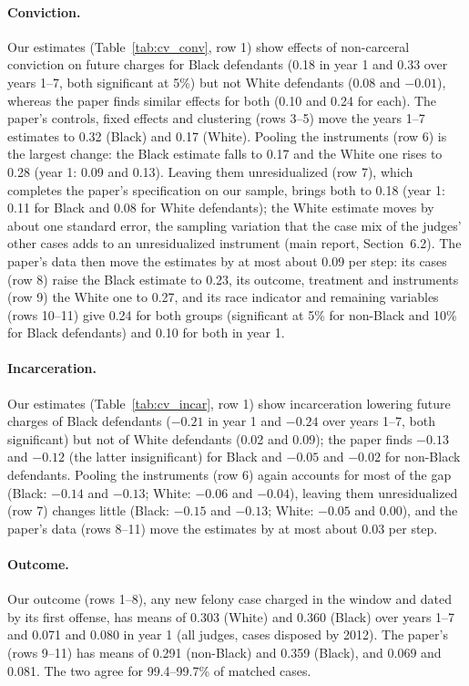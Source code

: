 \documentclass[11pt]{article}
\begin{document}
\paragraph{Conviction.} Our estimates (Table~\ref{tab:cv_conv}, row 1) show effects of non-carceral conviction on future charges for Black defendants (0.18 in year 1 and 0.33 over years 1--7, both significant at 5\%) but not White defendants (0.08 and $-0.01$), whereas the paper finds similar effects for both (0.10 and 0.24 for each). The paper's controls, fixed effects and clustering (rows 3--5) move the years 1--7 estimates to 0.32 (Black) and 0.17 (White). Pooling the instruments (row 6) is the largest change: the Black estimate falls to 0.17 and the White one rises to 0.28 (year 1: 0.09 and 0.13). Leaving them unresidualized (row 7), which completes the paper's specification on our sample, brings both to 0.18 (year 1: 0.11 for Black and 0.08 for White defendants); the White estimate moves by about one standard error, the sampling variation that the case mix of the judges' other cases adds to an unresidualized instrument (main report, Section~6.2). The paper's data then move the estimates by at most about 0.09 per step: its cases (row 8) raise the Black estimate to 0.23, its outcome, treatment and instruments (row 9) the White one to 0.27, and its race indicator and remaining variables (rows 10--11) give 0.24 for both groups (significant at 5\% for non-Black and 10\% for Black defendants) and 0.10 for both in year 1.

\paragraph{Incarceration.} Our estimates (Table~\ref{tab:cv_incar}, row 1) show incarceration lowering future charges of Black defendants ($-0.21$ in year 1 and $-0.24$ over years 1--7, both significant) but not of White defendants (0.02 and 0.09); the paper finds $-0.13$ and $-0.12$ (the latter insignificant) for Black and $-0.05$ and $-0.02$ for non-Black defendants. Pooling the instruments (row 6) again accounts for most of the gap (Black: $-0.14$ and $-0.13$; White: $-0.06$ and $-0.04$), leaving them unresidualized (row 7) changes little (Black: $-0.15$ and $-0.13$; White: $-0.05$ and 0.00), and the paper's data (rows 8--11) move the estimates by at most about 0.03 per step.

\paragraph{Outcome.} Our outcome (rows 1--8), any new felony case charged in the window and dated by its first offense, has means of 0.303 (White) and 0.360 (Black) over years 1--7 and 0.071 and 0.080 in year 1 (all judges, cases disposed by 2012). The paper's (rows 9--11) has means of 0.291 (non-Black) and 0.359 (Black), and 0.069 and 0.081. The two agree for 99.4--99.7\% of matched cases.
\end{document}

